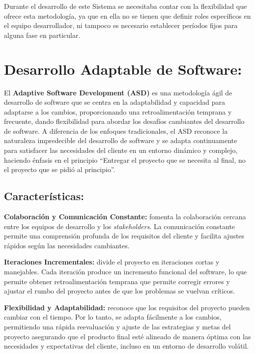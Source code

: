 \documentclass[
  12pt,
  openany]{book}
\begin{document}
Durante el desarrollo de este Sistema se necesitaba contar con la flexibilidad que ofrece esta metodología, ya que en ella no se tienen que definir roles específicos en el equipo desarrollador, ni tampoco es necesario establecer períodos fijos para alguna fase en particular.

\hypertarget{mmasd}{%
\section{Desarrollo Adaptable de Software:}\label{mmasd}}

El \textbf{Adaptive Software Development (ASD)} \citep{highsmith2000} es una metodología ágil de desarrollo de software que se centra en la adaptabilidad y capacidad para adaptarse a los cambios, proporcionando una retroalimentación temprana y frecuente, dando flexibilidad para abordar los desafíos cambiantes del desarrollo de software. A diferencia de los enfoques tradicionales, el ASD reconoce la naturaleza impredecible del desarrollo de software y se adapta continuamente para satisfacer las necesidades del cliente en un entorno dinámico y complejo, haciendo énfasis en el principio ``Entregar el proyecto que se necesita al final, no el proyecto que se pidió al principio''.

\hypertarget{caracteruxedsticas}{%
\subsection{Características:}\label{caracteruxedsticas}}

\textbf{Colaboración y Comunicación Constante:} fomenta la colaboración cercana entre los equipos de desarrollo y los \emph{stakeholders}. La comunicación constante permite una comprensión profunda de los requisitos del cliente y facilita ajustes rápidos según las necesidades cambiantes.

\textbf{Iteraciones Incrementales:} divide el proyecto en iteraciones cortas y manejables. Cada iteración produce un incremento funcional del software, lo que permite obtener retroalimentación temprana que permite corregir errores y ajustar el rumbo del proyecto antes de que los problemas se vuelvan críticos.

\textbf{Flexibilidad y Adaptabilidad:} reconoce que los requisitos del proyecto pueden cambiar con el tiempo. Por lo tanto, se adapta fácilmente a los cambios, permitiendo una rápida reevaluación y ajuste de las estrategias y metas del proyecto asegurando que el producto final esté alineado de manera óptima con las necesidades y expectativas del cliente, incluso en un entorno de desarrollo volátil.
\end{document}
